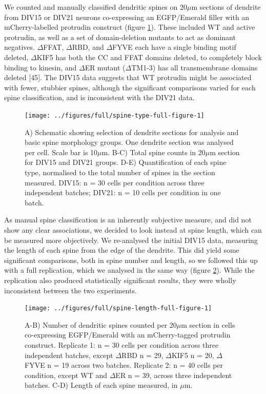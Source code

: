 \documentclass[
  12pt,
  a4paper,
]{book}
\begin{document}
We counted and manually classified dendritic spines on 20\(\mu\)m sections of dendrite from DIV15 or DIV21 neurons co-expressing an EGFP/Emerald filler with an mCherry-labelled protrudin construct (figure \ref{fig:spine-type-full-figure}). These included WT and active protrudin, as well as a set of domain-deletion mutants to act as dominant negatives. \(\Delta\)FFAT, \(\Delta\)RBD, and \(\Delta\)FYVE each have a single binding motif deleted, \(\Delta\)KIF5 has both the CC and FFAT domains deleted, to completely block binding to kinesin, and \(\Delta\)ER mutant (\(\Delta\)TM1-3) has all transmembrane domains deleted {[}45{]}. The DIV15 data suggests that WT protrudin might be associated with fewer, stubbier spines, although the significant comparisons varied for each spine classification, and is inconsistent with the DIV21 data.


\begin{figure}
\texttt{[image: ../figures/full/spine-type-full-figure-1]} \caption[Protrudin effect on dendritic spine morphology]{A) Schematic showing selection of dendrite sections for analysis and basic spine morphology groups.  One dendrite section was analysed per cell.  Scale bar is 10$\mu$m.  B-C) Total spine counts in 20$\mu$m section for DIV15 and DIV21 groups.  D-E) Quantification of each spine type, normalised to the total number of spines in the section measured.  DIV15: n = 30 cells per condition across three independent batches; DIV21: n = 10 cells per condition in one batch.}\label{fig:spine-type-full-figure}
\end{figure}

\restoregeometry
{} %

As manual spine classification is an inherently subjective measure, and did not show any clear associations, we decided to look instead at spine length, which can be measured more objectively. We re-analysed the initial DIV15 data, measuring the length of each spine from the edge of the dendrite. This did yield some significant comparisons, both in spine number and length, so we followed this up with a full replication, which we analysed in the same way (figure \ref{fig:spine-length-full-figure}). While the replication also produced statistically significant results, they were wholly inconsistent between the two experiments.

\begin{figure}
\texttt{[image: ../figures/full/spine-length-full-figure-1]} \caption[Protrudin effect on dendritic spine length]{A-B) Number of dendritic spines counted per 20$\mu$m section in cells co-expressing EGFP/Emerald with an mCherry-tagged protrudin construct.  Replicate 1: n = 30 cells per condition across three independent batches, except $\Delta$RBD n = 29, $\Delta$KIF5 n = 20, $\Delta$FYVE n = 19 across two batches.  Replicate 2: n = 40 cells per condition, except WT and $\Delta$ER n = 39, across three independent batches. C-D) Length of each spine measured, in $\mu$m.}\label{fig:spine-length-full-figure}
\end{figure}
\end{document}
